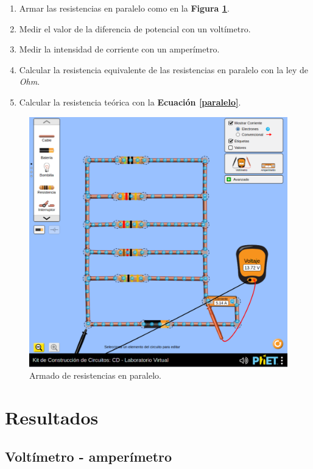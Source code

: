\documentclass[letter,11pt]{article}
\begin{document}
\begin{enumerate}
\item Armar las resistencias en paralelo como en la
    \textbf{Figura \ref{figura4}}.
\item Medir el valor de la diferencia de potencial con un voltímetro.
\item Medir la intensidad de corriente con un amperímetro.
\item Calcular la resistencia equivalente de las resistencias en paralelo con
    la ley de \emph{Ohm}.
\item Calcular la resistencia teórica con la \textbf{Ecuación \ref{paralelo}}.
\end{enumerate}

\begin{figure}[!h]
\centering
\includegraphics[scale=0.45]{resources/figura4.eps}
\caption{Armado de resistencias en paralelo.}
\label{figura4}
\end{figure}

\section{Resultados}

\subsection{Voltímetro - amperímetro}
\end{document}
